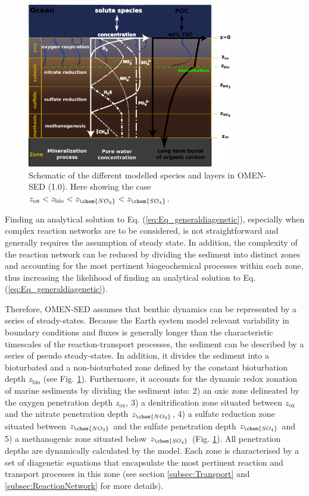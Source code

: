\documentclass[gmd, manuscript]{copernicus}
\begin{document}
\begin{figure}[htbp]
\begin{center}
	\includegraphics[width=0.8\textwidth]{figures/Sediment-model-with-profiles.pdf}
	\caption{Schematic of the different modelled species and layers in OMEN-SED (1.0). Here showing the case $z_{\mathrm{ox}} < z_{\mathrm{bio}} < z_{\chem{NO_3}} < z_{\chem{SO_4}}$.}
	\label{fig:Sediment_layers}
	\end{center}
\end{figure}

Finding an analytical solution to  Eq. (\ref{eq:Eq_generaldiagenetic}), especially when complex reaction networks are to be considered, is not straightforward and generally requires the assumption of steady state. 
In addition, the complexity of the reaction network can be reduced by dividing the sediment into distinct zones and accounting for the most pertinent biogeochemical processes 
within each zone, thus increasing the likelihood of finding an analytical solution to Eq. (\ref{eq:Eq_generaldiagenetic}). 

Therefore, OMEN-SED assumes that benthic dynamics can be represented by a series of steady-states. 
Because the Earth system model relevant variability in boundary conditions and fluxes is generally longer than the characteristic timescales of the reaction-transport processes, the sediment can be described by a 
series of pseudo steady-states. In addition, it divides the sediment into a bioturbated and a non-bioturbated zone defined by the constant bioturbation depth $z_{\mathrm{bio}}$ (see Fig. \ref{fig:Sediment_layers}). 
Furthermore, it accounts for the dynamic redox zonation of marine sediments by dividing the sediment into: 2) an oxic zone delineated by the oxygen 
penetration depth $z_{\mathrm{ox}}$, 3) a denitrification zone situated between $z_{\mathrm{ox}}$ and the nitrate penetration depth $z_{\chem{NO_3}}$, 4) 
a sulfate reduction zone situated between $z_{\chem{NO_3}}$ and the sulfate penetration depth $z_{\chem{SO_4}}$ and 5) a methanogenic zone situated below $z_{\chem{SO_4}}$ (Fig. \ref{fig:Sediment_layers}). 
All penetration depths are dynamically calculated by the model. 
Each zone is characterised by a set of diagenetic equations that encapsulate the most pertinent reaction and transport processes in this zone (see section \ref{subsec:Transport} and \ref{subsec:ReactionNetwork} 
for more details). 
\end{document}
